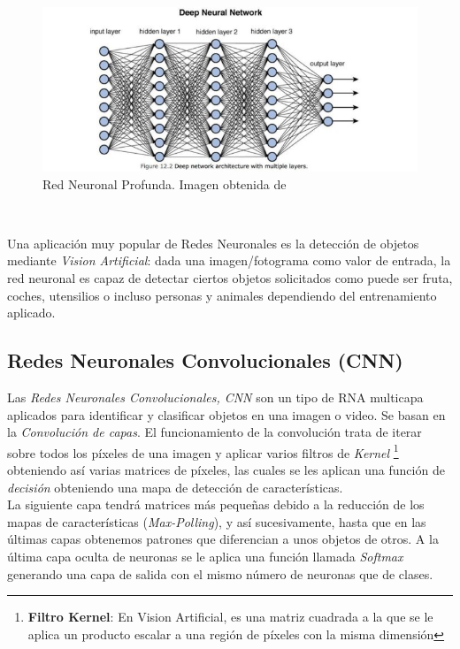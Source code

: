 \begin{figure}[H]
  \begin{center}
    \includegraphics[width=15cm]{imagenes/cap1/dnn.jpeg}
  \end{center}
  \caption[Red Neuronal Profunda (DNN)]{Red Neuronal Profunda. Imagen obtenida de \cite{dnn}}
  \label{fig:salida_perceptron}
\end{figure}\

Una aplicación muy popular de Redes Neuronales es la detección de objetos mediante \textit{Vision Artificial}: dada una imagen/fotograma como valor de entrada, la red neuronal es capaz de detectar ciertos objetos solicitados como puede ser fruta, coches, utensilios o incluso personas y animales dependiendo del entrenamiento aplicado.\\


\subsection{Redes Neuronales Convolucionales (CNN)}
\label{subsec:redes_convolucionales}

Las \textit{Redes Neuronales Convolucionales, CNN} son un tipo de RNA multicapa aplicados para identificar y clasificar objetos en una imagen o video. Se basan en la \textit{Convolución de capas}. El funcionamiento de la convolución trata de iterar sobre todos los píxeles de una imagen y aplicar varios filtros de \textit{Kernel} \footnote{\textbf{Filtro Kernel}: En Vision Artificial, es una matriz cuadrada a la que se le aplica un producto escalar a una región de píxeles con la misma dimensión} obteniendo así varias matrices de píxeles, las cuales se les aplican una función de \textit{decisión} obteniendo una mapa de detección de características.\\

La siguiente capa tendrá matrices más pequeñas debido a la reducción de los mapas de características (\textit{Max-Polling}), y así sucesivamente, hasta que en las últimas capas obtenemos patrones que diferencian a unos objetos de otros. A la última capa oculta de neuronas se le aplica una función llamada \textit{Softmax} generando una capa de salida con el mismo número de neuronas que de clases.\\

